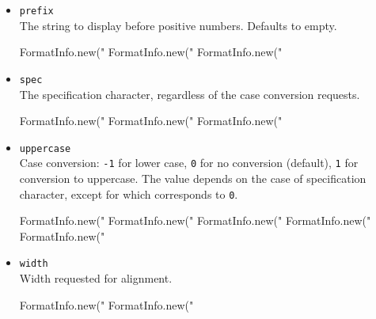 \begin{itemize}
\item \lstinline|prefix|\\
  The string to display before positive numbers.  Defaults to empty.
\begin{urbiassert}[firstnumber=last]
FormatInfo.new("%
FormatInfo.new("%
FormatInfo.new("%
\end{urbiassert}

\item \lstinline|spec|\\
  The specification character, regardless of the case conversion
  requests.
\begin{urbiassert}[firstnumber=last]
FormatInfo.new("%
FormatInfo.new("%
FormatInfo.new("%
\end{urbiassert}

\item \lstinline|uppercase|\\
  Case conversion: \lstinline|-1| for lower case, \lstinline|0| for no
  conversion (default), \lstinline|1| for conversion to uppercase.
  The value depends on the case of specification character, except for
   which corresponds to \lstinline|0|.
\begin{urbiassert}[firstnumber=last]
FormatInfo.new("%
FormatInfo.new("%
FormatInfo.new("%
FormatInfo.new("%
FormatInfo.new("%
\end{urbiassert}

\item \lstinline|width|\\
  Width requested for alignment.
\begin{urbiassert}[firstnumber=last]
FormatInfo.new("%
FormatInfo.new("%
\end{urbiassert}
\end{itemize}

